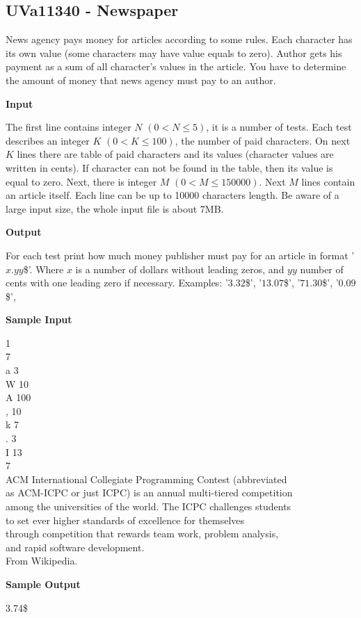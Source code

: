 \subsection{UVa11340 - Newspaper}
News agency pays money for articles according to some rules. Each character has its own value (some characters may have value equals to zero). Author gets his payment as a sum of all character's values in the article. You have to determine the amount of money that news agency must pay to an author.

\begin{flushleft}
{\color{red} \textbf{Input}}
\end{flushleft}
The first line contains integer $N$ $(0 < N \leq 5)$, it is a number of tests. Each test describes an integer $K$ $(0 < K \leq 100)$, the number of paid characters. On next $K$ lines there are table of paid characters and its values (character values are written in cents). If character can not be found in the table, then its value is equal to zero. Next, there is integer $M$ $(0 < M \leq 150000)$. Next $M$ lines contain an article itself. Each line can be up to 10000 characters length. Be aware of a large input size, the whole input file is about 7MB.

\begin{flushleft}
{\color{red} \textbf{Output}}
\end{flushleft}
For each test print how much money publisher must pay for an article in format '$x.yy$\$'. Where $x$ is a number of dollars without leading zeros, and $yy$ number of cents with one leading zero if necessary. Examples: '$3.32$\$', '$13.07$\$', '$71.30$\$', '$0.09$\$',

\begin{flushleft}
{\color{red} \textbf{Sample Input}}
\end{flushleft}
\begin{flushleft}
1\\
7\\
a 3\\
W 10\\
A 100\\
, 10\\
k 7\\
. 3\\
I 13\\
7\\
ACM International Collegiate Programming Contest (abbreviated\\
 as ACM-ICPC or just ICPC) is an annual multi-tiered competition\\
 among the universities of the world. The ICPC challenges students\\
 to set ever higher standards of excellence for themselves\\
 through competition that rewards team work, problem analysis,\\
 and rapid software development.\\
From Wikipedia.\\
\end{flushleft}

\begin{flushleft}
{\color{red} \textbf{Sample Output}}
\end{flushleft}
\begin{flushleft}
3.74\$\\
\end{flushleft}

\newpage